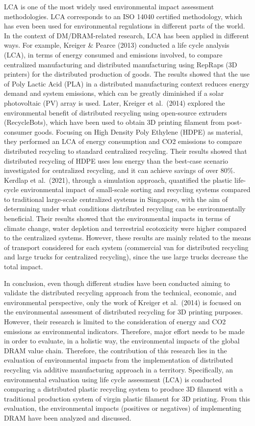 \documentclass[]{elsarticle} %
\begin{document}
LCA is one of the most widely used environmental impact assessment methodologies. LCA corresponds to an ISO 14040 certified methodology, which has even been used for environmental regulations in different parts of the world.
In the context of DM/DRAM-related research, LCA has been applied in different ways. For example, Kreiger \& Pearce (2013) conducted a life cycle analysis (LCA), in terms of energy consumed and emissions involved, to compare centralized manufacturing and distributed manufacturing using RepRaps (3D printers) for the distributed production of goods.
The results showed that the use of Poly Lactic Acid (PLA) in a distributed manufacturing context reduces energy demand and system emissions, which can be greatly diminished if a solar photovoltaic (PV) array is used.
Later, Kreiger et al.~(2014) explored the environmental benefit of distributed recycling using open-source extruders (RecycleBots), which have been used to obtain 3D printing filament from post-consumer goods. Focusing on High Density Poly Ethylene (HDPE) as material, they performed an LCA of energy consumption and CO2 emissions to compare distributed recycling to standard centralized recycling.
Their results showed that distributed recycling of HDPE uses less energy than the best-case scenario investigated for centralized recycling, and it can achieve savings of over 80\%.
Kerdlap et al.~(2021), through a simulation approach, quantified the plastic life-cycle environmental impact of small-scale sorting and recycling systems compared to traditional large-scale centralized systems in Singapore, with the aim of determining under what conditions distributed recycling can be environmentally beneficial.
Their results showed that the environmental impacts in terms of climate change, water depletion and terrestrial ecotoxicity were higher compared to the centralized systems.
However, these results are mainly related to the means of transport considered for each system (commercial van for distributed recycling and large trucks for centralized recycling), since the use large trucks decrease the total impact.

In conclusion, even though different studies have been conducted aiming to validate the distributed recycling approach from the technical, economic, and environmental perspective, only the work of Kreiger et al.~(2014) is focused on the environmental assessment of distributed recycling for 3D printing purposes.
However, their research is limited to the consideration of energy and CO2 emissions as environmental indicators. Therefore, major effort needs to be made in order to evaluate, in a holistic way, the environmental impacts of the global DRAM value chain.
Therefore, the contribution of this research lies in the evaluation of environmental impacts from the implementation of distributed recycling via additive manufacturing approach in a territory.
Specifically, an environmental evaluation using life cycle assessment (LCA) is conducted comparing a distributed plastic recycling system to produce 3D filament with a traditional production system of virgin plastic filament for 3D printing.
From this evaluation, the environmental impacts (positives or negatives) of implementing DRAM have been analyzed and discussed.
\end{document}
